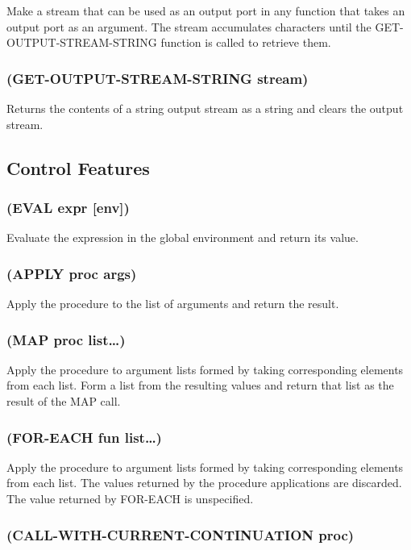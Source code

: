 \documentclass[11pt]{article}
\begin{document}
Make a stream that can be used as an output port in any function that
takes an output port as an argument.  The stream accumulates
characters until the GET-OUTPUT-STREAM-STRING function is called to
retrieve them.
\subsubsection{(GET-OUTPUT-STREAM-STRING stream)}
\label{sec-4-38-3}

Returns the contents of a string output stream as a string and clears
the output stream.
\subsection{Control Features}
\label{sec-4-39}

\subsubsection{(EVAL expr [env])}
\label{sec-4-39-1}

Evaluate the expression in the global environment and return its
value.
\subsubsection{(APPLY proc args)}
\label{sec-4-39-2}

Apply the procedure to the list of arguments and return the result.
\subsubsection{(MAP proc list\ldots{})}
\label{sec-4-39-3}

Apply the procedure to argument lists formed by taking corresponding
elements from each list.  Form a list from the resulting values and
return that list as the result of the MAP call.
\subsubsection{(FOR-EACH fun list\ldots{})}
\label{sec-4-39-4}

Apply the procedure to argument lists formed by taking corresponding
elements from each list.  The values returned by the procedure
applications are discarded.  The value returned by FOR-EACH is
unspecified.
\subsubsection{(CALL-WITH-CURRENT-CONTINUATION proc)}
\label{sec-4-39-5}
\end{document}
